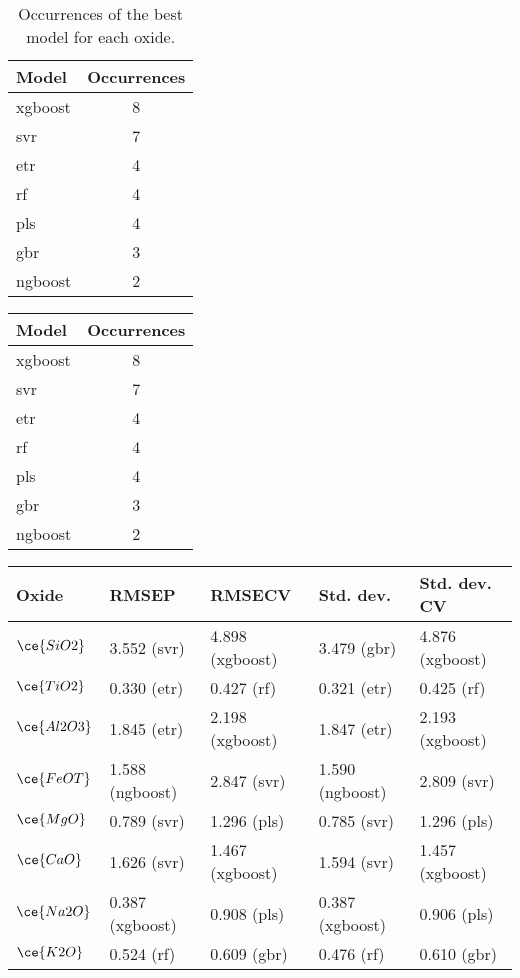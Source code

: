 \begin{table}[H]
\centering
\begin{tabular}{lc}
Model & Occurrences \\
\hline
\gls{xgboost} & 8 \\
\gls{svr} & 7 \\
\gls{etr} & 4 \\
\gls{rf} & 4 \\
\gls{pls} & 4 \\
\gls{gbr} & 3 \\
\gls{ngboost} & 2 \\
\end{tabular}
\caption{Occurrences of the best model for each oxide.}
\label{tab:best_model_occurrences}
\end{table}
\begin{tabular}{lc}
Model & Occurrences \\
\hline
\gls{xgboost} & 8 \\
\gls{svr} & 7 \\
\gls{etr} & 4 \\
\gls{rf} & 4 \\
\gls{pls} & 4 \\
\gls{gbr} & 3 \\
\gls{ngboost} & 2 \\
\end{tabular}
\label{tab:best_model_occurrences}
\begin{tabular}{l|llll}
Oxide & RMSEP & RMSECV & Std. dev. & Std. dev. CV \\
\hline
$\ce{SiO2}$ & 3.552 (\gls{svr}) & 4.898 (\gls{xgboost}) & 3.479 (\gls{gbr}) & 4.876 (\gls{xgboost}) \\
$\ce{TiO2}$ & 0.330 (\gls{etr}) & 0.427 (\gls{rf}) & 0.321 (\gls{etr}) & 0.425 (\gls{rf}) \\
$\ce{Al2O3}$ & 1.845 (\gls{etr}) & 2.198 (\gls{xgboost}) & 1.847 (\gls{etr}) & 2.193 (\gls{xgboost}) \\
$\ce{FeOT}$ & 1.588 (\gls{ngboost}) & 2.847 (\gls{svr}) & 1.590 (\gls{ngboost}) & 2.809 (\gls{svr}) \\
$\ce{MgO}$ & 0.789 (\gls{svr}) & 1.296 (\gls{pls}) & 0.785 (\gls{svr}) & 1.296 (\gls{pls}) \\
$\ce{CaO}$ & 1.626 (\gls{svr}) & 1.467 (\gls{xgboost}) & 1.594 (\gls{svr}) & 1.457 (\gls{xgboost}) \\
$\ce{Na2O}$ & 0.387 (\gls{xgboost}) & 0.908 (\gls{pls}) & 0.387 (\gls{xgboost}) & 0.906 (\gls{pls}) \\
$\ce{K2O}$ & 0.524 (\gls{rf}) & 0.609 (\gls{gbr}) & 0.476 (\gls{rf}) & 0.610 (\gls{gbr}) \\
\end{tabular}%
\label{tab:best_results}
